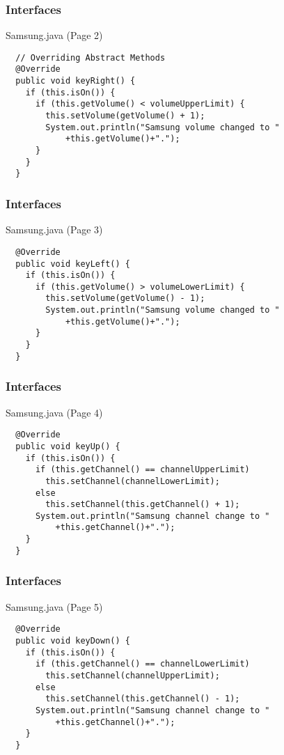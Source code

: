 \documentclass[10pt, compress]{beamer}
\begin{document}
\begin{frame}[fragile]
  \frametitle{Interfaces}
  \begin{block}{Samsung.java (Page 2)}
    \begin{verbatim}
  // Overriding Abstract Methods
  @Override
  public void keyRight() {
    if (this.isOn()) {
      if (this.getVolume() < volumeUpperLimit) {
        this.setVolume(getVolume() + 1);
        System.out.println("Samsung volume changed to "
            +this.getVolume()+".");
      }
    }
  }
    \end{verbatim}
  \end{block}
\end{frame}

\begin{frame}[fragile]
  \frametitle{Interfaces}
  \begin{block}{Samsung.java (Page 3)}
    \begin{verbatim}
  @Override
  public void keyLeft() {
    if (this.isOn()) {
      if (this.getVolume() > volumeLowerLimit) {
        this.setVolume(getVolume() - 1);
        System.out.println("Samsung volume changed to "
            +this.getVolume()+".");
      }
    }
  }
    \end{verbatim}
  \end{block}
\end{frame}

\begin{frame}[fragile]
  \frametitle{Interfaces}
  \begin{block}{Samsung.java (Page 4)}
    \begin{verbatim}
  @Override
  public void keyUp() {
    if (this.isOn()) {
      if (this.getChannel() == channelUpperLimit)
        this.setChannel(channelLowerLimit);
      else
        this.setChannel(this.getChannel() + 1);
      System.out.println("Samsung channel change to "
          +this.getChannel()+".");
    }
  }
    \end{verbatim}
  \end{block}
\end{frame}


\begin{frame}[fragile]
  \frametitle{Interfaces}
  \begin{block}{Samsung.java (Page 5)}
    \begin{verbatim}
  @Override
  public void keyDown() {
    if (this.isOn()) {
      if (this.getChannel() == channelLowerLimit)
        this.setChannel(channelUpperLimit);
      else
        this.setChannel(this.getChannel() - 1);
      System.out.println("Samsung channel change to "
          +this.getChannel()+".");
    }
  }
    \end{verbatim}
  \end{block}
\end{frame}
\end{document}
